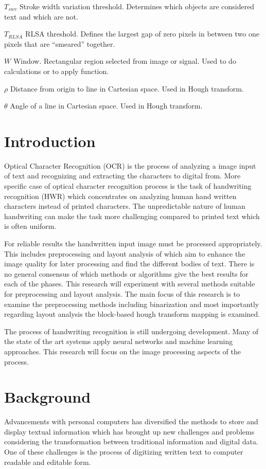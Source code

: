 \documentclass{article}
\begin{document}
\begin{abbrv}
    \item[$T_{swv}$] Stroke width variation threshold. Determines which objects are considered text and which are not.
    \item[$T_{RLSA}$] RLSA threshold. Defines the largest gap of zero pixels in between two one pixels that are ``smeared'' together.
    \item[$W$] Window. Rectangular region selected from image or signal. Used to do calculations or to apply function.
    \item[$\rho$] Distance from origin to line in Cartesian space. Used in Hough transform.
    \item[$\theta$] Angle of a line in Cartesian space. Used in Hough transform.
   \end{abbrv}

   \newpage
   \section{Introduction}
    Optical Character Recognition (OCR) is the process of analyzing a image input of  text and recognizing and extracting the characters to digital from. More specific case of optical character recognition process is the task of handwriting recognition (HWR) which concentrates on analyzing human hand written characters instead of printed characters. The unpredictable nature of human handwriting can make the task more challenging compared to printed text which is often uniform.

    For reliable results the handwritten input image must be processed appropriately. This includes preprocessing and layout analysis of which aim to enhance the image quality for later processing and find the different bodies of text. There is no general consensus of which methods or algorithms give the best results for each of the phases. This research will experiment with several methods suitable for preprocessing and layout analysis. The main focus of this research is to examine the preprocessing methods including binarization and most importantly regarding layout analysis the block-based hough transform mapping is examined.

    The process of handwriting recognition is still undergoing development. Many of the state of the art systems apply neural networks and machine learning approaches. This research will focus on the image processing aspects of the process.

  \newpage
  \section{Background}
    Advancements with personal computers has diversified the methods to store and display textual information which has brought up new challenges and problems considering the transformation between traditional information and digital data. One of these challenges is the process of digitizing written text to computer readable and editable form.
\end{document}
